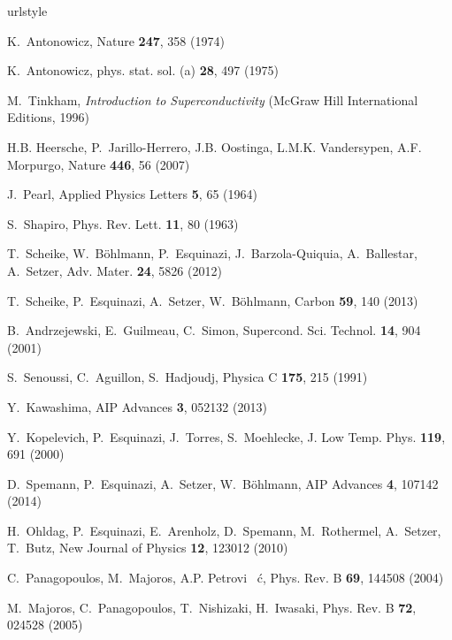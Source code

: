 \documentclass[aps,dvipsnames,twocolumn,floatfix,amsmath]{revtex4-1}
\begin{document}
\begin{thebibliography}{10}
\providecommand{\url}[1]{{#1}} \providecommand{\urlprefix}{URL }
\expandafter\ifx\csname urlstyle\endcsname\relax
  \providecommand{\doi}[1]{DOI \discretionary{}{}{}#1}\else
  \providecommand{\doi}{DOI \discretionary{}{}{}\begingroup
  \urlstyle{rm}\Url}\fi

K.~Antonowicz, Nature \textbf{247}, 358 (1974)

K.~Antonowicz, phys. stat. sol. (a) \textbf{28}, 497 (1975)

M.~Tinkham, \emph{Introduction to Superconductivity} (McGraw Hill
International
  Editions, 1996)

H.B. Heersche, P.~Jarillo-Herrero, J.B. Oostinga, L.M.K.
Vandersypen, A.F.
  Morpurgo, Nature \textbf{446}, 56 (2007)

J.~Pearl, Applied Physics Letters \textbf{5}, 65 (1964)

S.~Shapiro, Phys. Rev. Lett. \textbf{11}, 80 (1963)

T.~Scheike, W.~B\"ohlmann, P.~Esquinazi, J.~Barzola-Quiquia,
A.~Ballestar,
  A.~Setzer, Adv. Mater. \textbf{24}, 5826 (2012)

T.~Scheike, P.~Esquinazi, A.~Setzer, W.~B\"ohlmann, Carbon
\textbf{59}, 140
  (2013)

B.~Andrzejewski, E.~Guilmeau, C.~Simon, Supercond. Sci. Technol.
\textbf{14},
  904 (2001)

S.~Senoussi, C.~Aguillon, S.~Hadjoudj, Physica C \textbf{175}, 215
(1991)

Y.~Kawashima, AIP Advances \textbf{3}, 052132 (2013)

Y.~Kopelevich, P.~Esquinazi, J.~Torres, S.~Moehlecke, J. Low Temp.
Phys.
  \textbf{119}, 691 (2000)

D.~Spemann, P.~Esquinazi, A.~Setzer, W.~B\"ohlmann, AIP Advances
\textbf{4},
  107142 (2014)

H.~Ohldag, P.~Esquinazi, E.~Arenholz, D.~Spemann, M.~Rothermel,
A.~Setzer,
  T.~Butz, New Journal of Physics \textbf{12}, 123012 (2010)

C.~Panagopoulos, M.~Majoros, A.P. Petrovi\ifmmode~\else
\'{c}\fi{},
  Phys. Rev. B \textbf{69}, 144508 (2004)

M.~Majoros, C.~Panagopoulos, T.~Nishizaki, H.~Iwasaki, Phys. Rev.
B
  \textbf{72}, 024528 (2005)


\end{thebibliography}
\end{document}
